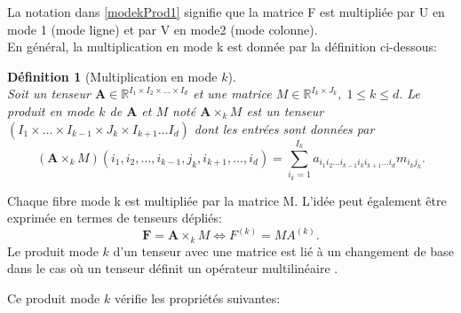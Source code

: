 \documentclass[11pt,a4paper,oneside]{book}
\newtheorem{defi}{Définition}[chapter]
\def\R{\mathbb R}
\newcommand{\mbf}[1]{\mathbf{#1}}
\begin{document}
La notation dans \eqref{modekProd1} signifie que la matrice F est multipliée par U en mode 1 (mode ligne) et par V en mode2 (mode colonne).\\
En général, la multiplication en mode k est donnée par la définition ci-dessous:
\begin{defi}[Multiplication en mode $ k $]
\emph{\\}
Soit un tenseur  $\mathbf{A} \in \R^{I_1 \times I_2\times \ldots \times I_{d}}$ et une matrice $M \in \R^{I_k \times J_k},\; 1\leq k \leq d.$ Le produit en mode $k$ de $\mbf{A}$ et $M$ noté $\mbf{A}\times_k M$ est un tenseur $\left(I_1 \times \ldots \times I_{k-1}\times J_k \times I_{k+1} \ldots I_d\right) $ dont les entrées sont données par
\begin{equation}
\left(\mbf{A}\times_k M \right)(i_1, i_2, \ldots,i_{k-1}, j_k,i_{k+1}, \ldots, i_d)= \sum_{i_{k}=1}^{I_{k}} a_{i_1 i_2 \ldots  i_{k-1} i_k  i_{k+1} \ldots i_d}m_{i_kj_k}. 
\end{equation}
\end{defi}
Chaque fibre mode k est multipliée par la matrice M. L'idée peut également être exprimée en termes de tenseurs dépliés:
\begin{equation}
\mbf{F}=\mbf{A}\times_{k}M\Leftrightarrow F^{(k)}=MA^{(k)}.
\end{equation}
Le produit  mode $ k $ d'un tenseur avec une matrice est lié à un changement de base dans le cas où un tenseur définit un opérateur multilinéaire \cite[p.461]{Hong2008}.

 Ce produit mode $ k $ vérifie les propriétés suivantes:
\end{document}
